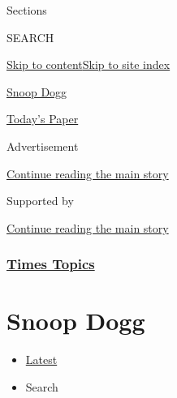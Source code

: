 Sections

SEARCH

\protect\hyperlink{site-content}{Skip to
content}\protect\hyperlink{site-index}{Skip to site index}

\href{https://www.nytimes3xbfgragh.onion/topic/person/snoop-dogg}{Snoop
Dogg}

\href{https://myaccount.nytimes3xbfgragh.onion/auth/login?response_type=cookie\&client_id=vi}{}

\href{https://www.nytimes3xbfgragh.onion/section/todayspaper}{Today's
Paper}

Advertisement

\protect\hyperlink{after-top}{Continue reading the main story}

Supported by

\protect\hyperlink{after-sponsor}{Continue reading the main story}

\hypertarget{times-topics}{%
\subsubsection{\texorpdfstring{\href{/index.html}{Times
Topics}}{Times Topics}}\label{times-topics}}

\hypertarget{snoop-dogg}{%
\section{Snoop Dogg}\label{snoop-dogg}}

\begin{itemize}
\tightlist
\item
  \protect\hyperlink{stream-panel}{Latest}
\item
  Search
\end{itemize}

